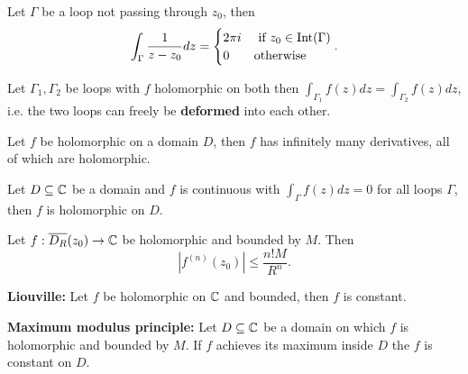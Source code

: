 \begin{multicols}{2}
\begin{theorem}[3.4.11]
Let $\Gamma$ be a loop not passing through $z_0$, then
    \[
    \int_\Gamma \frac{1}{z-z_0} dz =
    \begin{cases}
    2\pi i  &\text{ if } z_0\in \mathrm{Int}(\Gamma) \\
    0       &\text{otherwise}
    \end{cases}.
    \]
\end{theorem}

\begin{theorem}[3.4.12]
Let $\Gamma_1,\Gamma_2$ be loops with $f$ holomorphic on both then $\int_{\Gamma_1}f(z)dz=\int_{\Gamma_2}f(z)dz$, i.e. the two loops can freely be \textbf{deformed} into each other.
\end{theorem}

\begin{theorem}[3.5.2]
Let $f$ be holomorphic on a domain $D$, then $f$ has infinitely many derivatives, all of which are holomorphic.
\end{theorem}

\begin{theorem}[Morera]
Let $D\subseteq\mathbb{C}$ be a domain and $f$ is continuous with $\int_\Gamma f(z)dz=0$ for all loops $\Gamma$, then $f$ is holomorphic on $D$.
\end{theorem}

\begin{theorem}
Let $f:\overline{D_R}(z_0)\to\mathbb{C}$ be holomorphic and bounded by $M$. Then
    \[
    |f^{(n)}(z_0)| \leq \frac{n!M}{R^n}.
    \]
\end{theorem}

\begin{theorem}
\textbf{Liouville:} Let $f$ be holomorphic on $\mathbb{C}$ and bounded, then $f$ is constant.
\end{theorem}

\begin{theorem}
\textbf{Maximum modulus principle:} Let $D\subseteq\mathbb{C}$ be a domain on which $f$ is holomorphic and bounded by $M$. If $f$ achieves its maximum inside $D$ the $f$ is constant on $D$.
\end{theorem}



\end{multicols}